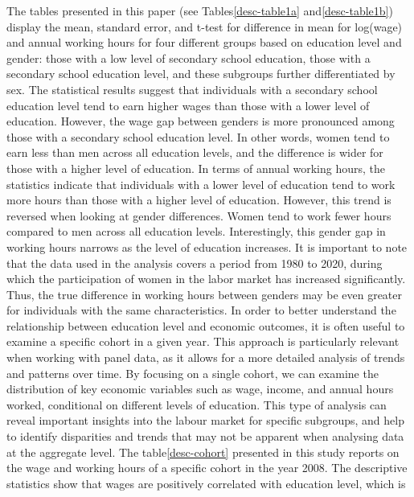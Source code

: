 \documentclass{sistedes}
\begin{document}
The tables presented in this paper (see Tables\ref{desc-table1a} and\ref{desc-table1b}) display the mean, standard
error, and t-test for difference in mean for log(wage) and annual working hours for four different groups based on
education level and gender: those with a low level of secondary school education, those with a secondary school
education level, and these subgroups further differentiated by sex. The statistical results suggest that individuals
with a secondary school education level tend to earn higher wages than those with a lower level of education. However,
the wage gap between genders is more pronounced among those with a secondary school education level. In other words,
women tend to earn less than men across all education levels, and the difference is wider for those with a higher level
of education.
\newline
In terms of annual working hours, the statistics indicate that individuals with a lower level of education tend to work
more hours than those with a higher level of education. However, this trend is reversed when looking at gender
differences. Women tend to work fewer hours compared to men across all education levels. Interestingly, this gender gap
in working hours narrows as the level of education increases. It is important to note that the data used in the analysis
covers a period from 1980 to 2020, during which the participation of women in the labor market has increased
significantly. Thus, the true difference in working hours between genders may be even greater for individuals with the
same characteristics.\newline
In order to better understand the relationship between education level and economic outcomes, it is often useful to
examine a specific cohort in a given year. This approach is particularly relevant when working with panel data, as it
allows for a more detailed analysis of trends and patterns over time. By focusing on a single cohort, we can examine the
distribution of key economic variables such as wage, income, and annual hours worked, conditional on different levels of
education. This type of analysis can reveal important insights into the labour market for specific subgroups, and help
to identify disparities and trends that may not be apparent when analysing data at the aggregate level.
\newline
The table\ref{desc-cohort} presented in this study reports on the wage and working hours of a specific cohort in the
year 2008. The descriptive statistics show that wages are positively correlated with education level, which is
\end{document}
